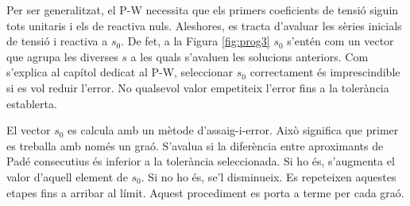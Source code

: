     


Per ser generalitzat, el P-W necessita que els primers coeficients de tensió siguin tots unitaris i els de reactiva nuls. Aleshores, es tracta d'avaluar les sèries inicials de tensió i reactiva a $s_0$. De fet, a la Figura \ref{fig:prog3} $s_0$ s'entén com un vector que agrupa les diverses $s$ a les quals s'avaluen les solucions anteriors. Com s'explica al capítol dedicat al P-W, seleccionar $s_0$ correctament és imprescindible si es vol reduir l'error. No qualsevol valor empetiteix l'error fins a la tolerància establerta.

El vector $s_0$ es calcula amb un mètode d'assaig-i-error. Això significa que primer es treballa amb només un graó. S'avalua si la diferència entre aproximants de Padé consecutius és inferior a la tolerància seleccionada. Si ho és, s'augmenta el valor d'aquell element de $s_0$. Si no ho és, se'l disminueix. Es repeteixen aquestes etapes fins a arribar al límit. Aquest procediment es porta a terme per cada graó.


